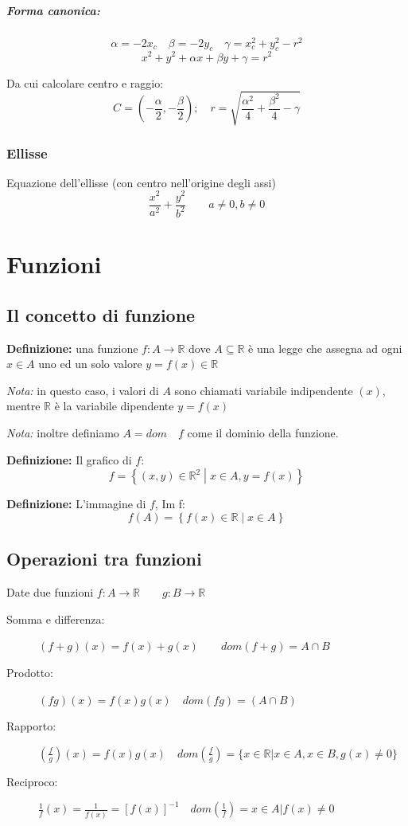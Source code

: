 \documentclass[11pt,a4paper,notitlepage]{report}
\let\numberset\mathbb
\newcommand{\R}{\numberset{R}}
\begin{document}
\paragraph{Forma canonica:}
\[\alpha = -2x_c \quad \beta = -2y_c \quad \gamma = x_c^2 + y_c^2 - r^2\]
\[x^2+y^2+\alpha x+ \beta y +\gamma =r^2\]

Da cui calcolare centro e raggio:
\[C=\left(-\frac{\alpha}{2}, -\frac{\beta}{2}\right); \quad r=\sqrt{\frac{\alpha^2}{4}+\frac{\beta^2}{4}-\gamma}\]

\subsection{Ellisse}
Equazione dell'ellisse (con centro nell'origine degli assi)
\[\frac{x^2}{a^2}+\frac{y^2}{b^2} \qquad a\neq 0 , b\neq 0\]




\chapter{Funzioni}
\section{Il concetto di funzione}
\textbf{Definizione:} una funzione $f: A \rightarrow \R$ dove $A \subseteq \R$ è una legge che assegna ad ogni $x\in A$ uno ed un solo valore $y=f(x) \in \R$

\textit{Nota:} in questo caso, i valori di $A$ sono chiamati variabile indipendente $(x)$, mentre  $\R$ è la variabile dipendente $y=f(x)$

\textit{Nota:} inoltre definiamo $A=dom \quad f$ come il dominio della funzione.

\textbf{Definizione:} Il grafico di $f$:
	\[f=\left\{ (x,y) \in \R^2 \middle| x \in A, y=f(x) \right\}\]

\textbf{Definizione:} L'immagine di $f$, Im f:
	\[f(A)=\left\{ f(x) \in \R \middle| x \in A \right\}\]

\section{Operazioni tra funzioni}
Date due funzioni $f:A\rightarrow \R \qquad g:B\rightarrow \R$
\begin{description}
	\item[Somma e differenza:] $(f+g)(x)=f(x)+g(x) \qquad dom(f+g)=A\cap B$
	\item[Prodotto:] $(fg)(x)=f(x)g(x) \quad dom(fg)=(A\cap B)$
	\item[Rapporto:] $(\frac{f}{g})(x)=f(x)g(x) \quad dom(\frac{f}{g})=\{x\in \R | x\in A, x\in B, g(x) \neq 0\}$
	\item[Reciproco:] $\frac{1}{f}(x)=\frac{1}{f(x)}=[f(x)]^{-1} \quad dom(\frac{1}{f})={x\in A | f(x) \neq 0}$
\end{description}
\end{document}
